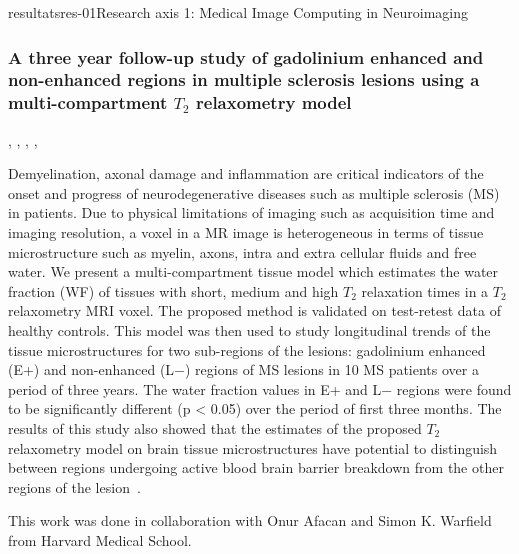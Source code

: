 \documentclass{ra2018}
\begin{document}
\begin{module}{resultats}{res-01}{Research axis 1: Medical Image Computing in Neuroimaging}
\subsubsection{A three year follow-up study of gadolinium enhanced and non-enhanced regions in multiple sclerosis lesions using a multi-compartment $T_2$ relaxometry model}
\begin{participants}
      ,
      , 
      ,
      ,
\end{participants}
Demyelination, axonal damage and inflammation are critical indicators of the onset and progress of neurodegenerative diseases such as multiple sclerosis (MS) in patients. Due to physical limitations of imaging such as acquisition time and imaging resolution, a voxel in a MR image is heterogeneous in terms of tissue microstructure such as myelin, axons, intra and extra cellular fluids and free water. We present a multi-compartment tissue model which estimates the water fraction (WF) of tissues with short, medium and high $T_2$ relaxation times in a $T_2$ relaxometry MRI voxel. The proposed method is validated on test-retest data of healthy controls. This model was then used to study longitudinal trends of the tissue microstructures for two sub-regions of the lesions: gadolinium enhanced (E+) and non-enhanced (L−) regions of MS lesions in 10 MS patients over a period of three years. The water fraction values in E+ and L− regions were found to be significantly different (p < 0.05) over the period of first three months. The results of this study also showed that the estimates of the proposed $T_2$ relaxometry model on brain tissue microstructures have potential to distinguish between regions undergoing active blood brain barrier breakdown from the other regions of the lesion~\cite{chatterjee:hal-01837974}.

This work was done in collaboration with Onur Afacan and Simon K. Warfield from Harvard Medical School.


\end{module}
\end{document}
